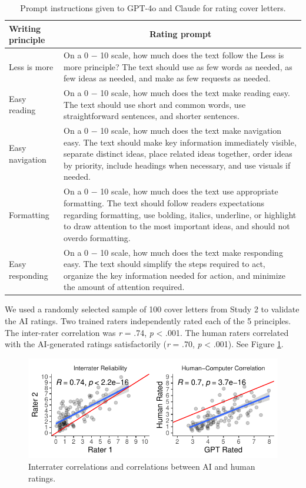 \documentclass[11pt]{report}
\begin{document}
\begin{append}
\begin{table}[ht]
    \centering
    \caption{Prompt instructions given to GPT-4o and Claude for rating cover letters.}
    \label{tab:prompts}
    \begin{tabular}{lp{15cm}}
    \toprule
    \textbf{Writing principle} & \multicolumn{1}{c}{\textbf{Rating prompt}}\\
    \midrule
        Less is more	& On a 0 $-$ 10 scale, how much does the text follow the Less is more principle? The text should use as few words as needed, as few ideas as needed, and make as few requests as needed. \\
        Easy reading	& On a 0 $-$ 10 scale, how much does the text make reading easy. The text should use short and common words, use straightforward sentences, and shorter sentences.\\
        Easy navigation	& On a 0 $-$ 10 scale, how much does the text make navigation easy. The text should make key information immediately visible, separate distinct ideas, place related ideas together, order ideas by priority, include headings when necessary, and use visuals if needed.\\
        Formatting	& On a 0 $-$ 10 scale, how much does the text use appropriate formatting. The text should follow readers expectations regarding formatting, use bolding, italics, underline, or highlight to draw attention to the most important ideas, and should not overdo formatting.\\
        Easy responding &	On a 0 $-$ 10 scale, how much does the text make responding easy. The text should simplify the steps required to act, organize the key information needed for action, and minimize the amount of attention required.  \\ \bottomrule
    \end{tabular}


    
\end{table}

We used a randomly selected sample of 100 cover letters from Study 2 to validate the AI ratings. Two trained raters independently rated each of the 5 principles. The inter-rater correlation was \textit{r} = .74, \textit{p} < .001. The human raters correlated with the AI-generated ratings satisfactorily (\textit{r} = .70, \textit{p} < .001).     See Figure \ref{fig:ai_valid}.

\begin{figure}[ht]
    \centering
    \includegraphics[width=0.75\linewidth]{ai_validity.pdf}
    \caption{Interrater correlations and correlations between AI and human ratings.}
    \label{fig:ai_valid}
\end{figure}


\end{append}
\end{document}
